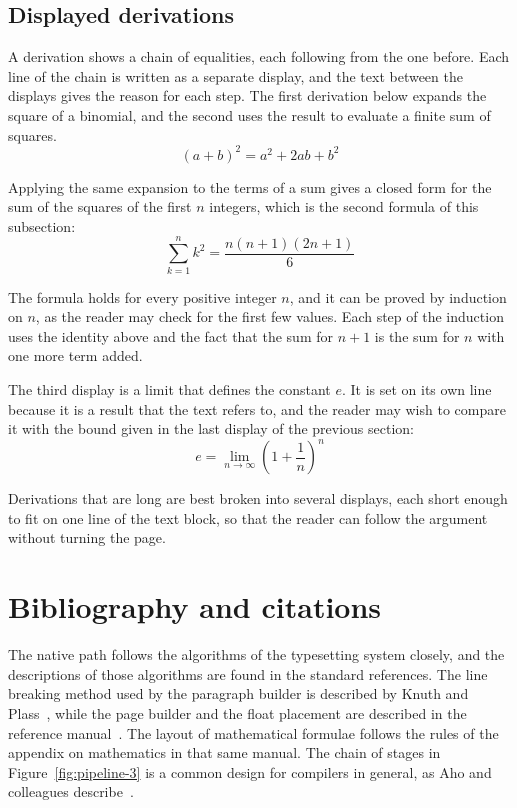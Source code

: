 \documentclass{article}
\begin{document}
\subsection{Displayed derivations}\label{sec:derivations-3}

A derivation shows a chain of equalities, each following from the one before. Each line
of the chain is written as a separate display, and the text between the displays gives
the reason for each step. The first derivation below expands the square of a binomial,
and the second uses the result to evaluate a finite sum of squares.
\[
  (a+b)^{2} = a^{2} + 2ab + b^{2}
\]

Applying the same expansion to the terms of a sum gives a closed form for the sum of the
squares of the first $n$ integers, which is the second formula of this subsection:
\[
  \sum_{k=1}^{n} k^{2} = \frac{n(n+1)(2n+1)}{6}
\]

The formula holds for every positive integer $n$, and it can be proved by induction on
$n$, as the reader may check for the first few values. Each step of the induction
uses the identity above and the fact that the sum for $n+1$ is the sum for $n$ with one
more term added.

The third display is a limit that defines the constant $e$. It is set on its own line
because it is a result that the text refers to, and the reader may wish to compare it
with the bound given in the last display of the previous section:
\[
  e = \lim_{n\to\infty} \left( 1 + \frac{1}{n} \right)^{n}
\]

Derivations that are long are best broken into several displays, each short enough to
fit on one line of the text block, so that the reader can follow the argument without
turning the page.

\section{Bibliography and citations}\label{sec:refs-3}

The native path follows the algorithms of the typesetting system closely, and the
descriptions of those algorithms are found in the standard references. The line
breaking method used by the paragraph builder is described by Knuth and
Plass~\cite{knuth81-3}, while the page builder and the float placement are described in
the reference manual~\cite{knuth86-3}. The layout of mathematical formulae follows the
rules of the appendix on mathematics in that same manual. The chain of stages in
Figure~\ref{fig:pipeline-3} is a common design for compilers in general, as Aho and
colleagues describe~\cite{aho06-3}.
\end{document}
